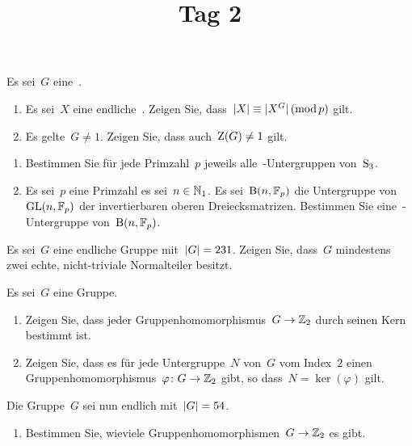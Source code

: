 \documentclass{scrartcl}
\title{\vspace{-1em}Tag 2}
\author{}
\date{}
\begin{document}
\maketitle
\vspace{-7em}

\begin{exercise}
  Es sei~$G$ eine~.
  \begin{enumerate}
    \item
      Es sei~$X$ eine endliche~.
      Zeigen Sie, dass~$\lvert X\rvert \equiv \lvert X^G \rvert \,(\operatorname{mod} p)$ gilt.
    \item
      Es gelte~$G \neq 1$.
      Zeigen Sie, dass auch~$\operatorname{Z}(G) \neq 1$ gilt.
  \end{enumerate}
\end{exercise}

\begin{exercise}
  \begin{enumerate}
    \item
      Bestimmen Sie für jede Primzahl~$p$ jeweils alle~-Untergruppen von~$\operatorname{S}_3$.
    \item
      Es sei~$p$ eine Primzahl es sei~$n \in \mathbb{N}_1$.
      Es sei~$\operatorname{B}(n, \mathbb{F}_p)$ die Untergruppe von~$\operatorname{GL}(n, \mathbb{F}_p)$ der invertierbaren oberen Dreiecksmatrizen.
      Bestimmen Sie eine~-Untergruppe von~$\operatorname{B}(n, \mathbb{F}_p)$.
  \end{enumerate}
\end{exercise}

\begin{exercise}
  Es sei~$G$ eine endliche Gruppe mit~$\lvert G\rvert = 231$.
  Zeigen Sie, dass~$G$ mindestens zwei echte, nicht-triviale Normalteiler besitzt.
\end{exercise}

\begin{exercise}[subtitle = {Erstklausur 18/19}]
  Es sei~$G$ eine Gruppe.
  \begin{enumerate}
    \item
      Zeigen Sie, dass jeder Gruppenhomomorphismus~$G \to \Integer_2$ durch seinen Kern bestimmt ist.
    \item
      Zeigen Sie, dass es für jede Untergruppe~$N$ von~$G$ vom Index~$2$ einen Gruppenhomomorphismus~$\varphi \colon G \to \Integer_2$ gibt, so dass~$N = \ker(\varphi)$ gilt.
  \end{enumerate}
  Die Gruppe~$G$ sei nun endlich mit~$\lvert G\rvert = 54$.
  \begin{enumerate}[resume*]
    \item
      Bestimmen Sie, wieviele Gruppenhomomorphismen~$G \to \Integer_2$ es gibt.
  \end{enumerate}
\end{exercise}
\end{document}
